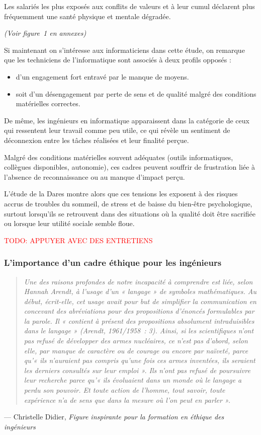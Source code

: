 \documentclass[12pt,a4paper]{report}
\begin{document}
Les salariés les plus exposés aux conflits de valeurs et à leur cumul déclarent plus fréquemment une santé physique et mentale dégradée.

\begin{center}
\textit{(Voir figure~1 en annexes)}
\end{center}

Si maintenant on s'intéresse aux informaticiens dans cette étude, on remarque que les techniciens de l'informatique sont associés à deux profils opposés :
\begin{itemize}
    \item d'un engagement fort entravé par le manque de moyens.
    \item soit d'un désengagement par perte de sens et de qualité malgré des conditions matérielles correctes.
\end{itemize}

De même, les ingénieurs en informatique apparaissent dans la catégorie de ceux qui ressentent leur travail comme peu utile, ce qui révèle un sentiment de déconnexion entre les tâches réalisées et leur finalité perçue.

Malgré des conditions matérielles souvent adéquates (outils informatiques, collègues disponibles, autonomie), ces cadres peuvent souffrir de frustration liée à l'absence de reconnaissance ou au manque d'impact perçu.

L'étude de la Dares montre alors que ces tensions les exposent à des risques accrus de troubles du sommeil, de stress et de baisse du bien-être psychologique, surtout lorsqu'ils se retrouvent dans des situations où la qualité doit être sacrifiée ou lorsque leur utilité sociale semble floue.

\textcolor{red}{TODO: APPUYER AVEC DES ENTRETIENS}

\subsubsection{L'importance d'un cadre éthique pour les ingénieurs}

\begin{quote}
	\textit{Une des raisons profondes de notre incapacité à comprendre est liée, selon Hannah Arendt, à l'usage d'un « langage » de symboles mathématiques. Au début, écrit-elle, cet usage avait pour but de simplifier la communication en concevant des abréviations pour des propositions d'énoncés formulables par la parole. Il « contient à présent des propositions absolument intraduisibles dans le langage » (Arendt, 1961/1958~: 3).
Ainsi, si les scientifiques n'ont pas refusé de développer des armes nucléaires, ce n'est pas d'abord, selon elle, par manque de caractère ou de courage ou encore par naïveté, parce qu'« ils n'auraient pas compris qu'une fois ces armes inventées, ils seraient les derniers consultés sur leur emploi ». 
Ils n'ont pas refusé de poursuivre leur recherche parce qu'« ils évoluaient dans un monde où le langage a perdu son pouvoir. Et toute action de l'homme, tout savoir, toute expérience n'a de sens que dans la mesure où l'on peut en parler ».}
\end{quote}
\hfill --- Christelle Didier, \textit{Figure inspirante pour la formation en éthique des ingénieurs}
\end{document}
